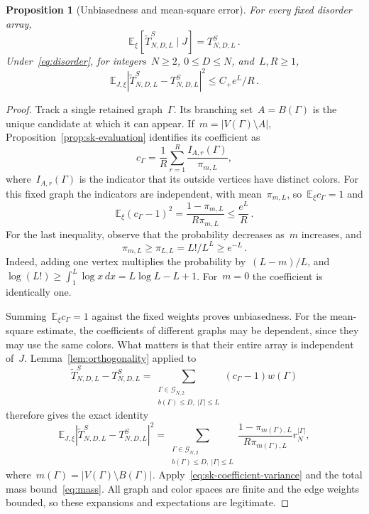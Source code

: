 \documentclass[10pt]{article}
\theoremstyle{plain}
\newtheorem{proposition}[theorem]{Proposition}
\theoremstyle{definition}
\theoremstyle{remark}
\begin{document}
\begin{proposition}[Unbiasedness and mean-square error]\label{prop:sk-color-error}
For every fixed disorder array,
\begin{equation}\label{eq:sk-unbiased}
 \mathbb E_\xi[\widetilde T^S_{N,D,L}\mid J]=T^S_{N,D,L}\,.
\end{equation}
Under~\eqref{eq:disorder}, for integers~$N\ge2$, $0\le D\le N$, and~$L,R\ge1$,
\begin{equation}\label{eq:sk-color-mse}
 \mathbb E_{J,\xi}|\widetilde T^S_{N,D,L}-T^S_{N,D,L}|^2\le C_+e^L/R\,.
\end{equation}
\end{proposition}
\begin{proof}
Track a single retained graph~$\Gamma$. Its branching set~$A=B(\Gamma)$ is the unique candidate at which it can appear. If~$m=|V(\Gamma)\setminus A|$, Proposition~\ref{prop:sk-evaluation} identifies its coefficient as
\begin{equation*}
 c_\Gamma=\frac1R\sum_{r=1}^{R}\frac{I_{A,r}(\Gamma)}{\pi_{m,L}},
\end{equation*}
where~$I_{A,r}(\Gamma)$ is the indicator that its outside vertices have distinct colors. For this fixed graph the indicators are independent, with mean~$\pi_{m,L}$, so~$\mathbb E_\xi c_\Gamma=1$ and
\begin{equation}\label{eq:sk-coefficient-variance}
 \mathbb E_\xi(c_\Gamma-1)^2=\frac{1-\pi_{m,L}}{R\pi_{m,L}}\le\frac{e^L}{R}\,.
\end{equation}
For the last inequality, observe that the probability decreases as~$m$ increases, and
\begin{equation}\label{eq:sk-color-lower-bound}
 \pi_{m,L}\ge\pi_{L,L}=L!/L^L\ge e^{-L}\,.
\end{equation}
Indeed, adding one vertex multiplies the probability by~$(L-m)/L$, and~$\log(L!)\ge\int_1^L\log x\,dx=L\log L-L+1$. For~$m=0$ the coefficient is identically one.

Summing~$\mathbb E_\xi c_\Gamma=1$ against the fixed weights proves unbiasedness. For the mean-square estimate, the coefficients of different graphs may be dependent, since they may use the same colors. What matters is that their entire array is independent of~$J$. Lemma~\ref{lem:orthogonality} applied to
\begin{equation*}
 \widetilde T^S_{N,D,L}-T^S_{N,D,L}
 =\sum_{\substack{\Gamma\in\mathcal G_{N,2}\\b(\Gamma)\le D,\ |\Gamma|\le L}}(c_\Gamma-1)w(\Gamma)
\end{equation*}
therefore gives the exact identity
\begin{equation}\label{eq:sk-color-mse-exact}
 \mathbb E_{J,\xi}|\widetilde T^S_{N,D,L}-T^S_{N,D,L}|^2
 =\sum_{\substack{\Gamma\in\mathcal G_{N,2}\\b(\Gamma)\le D,\ |\Gamma|\le L}}
 \frac{1-\pi_{m(\Gamma),L}}{R\pi_{m(\Gamma),L}}r_N^{|\Gamma|},
\end{equation}
where~$m(\Gamma)=|V(\Gamma)\setminus B(\Gamma)|$. Apply~\eqref{eq:sk-coefficient-variance} and the total mass bound~\eqref{eq:mass}. All graph and color spaces are finite and the edge weights bounded, so these expansions and expectations are legitimate.
\end{proof}
\end{document}
